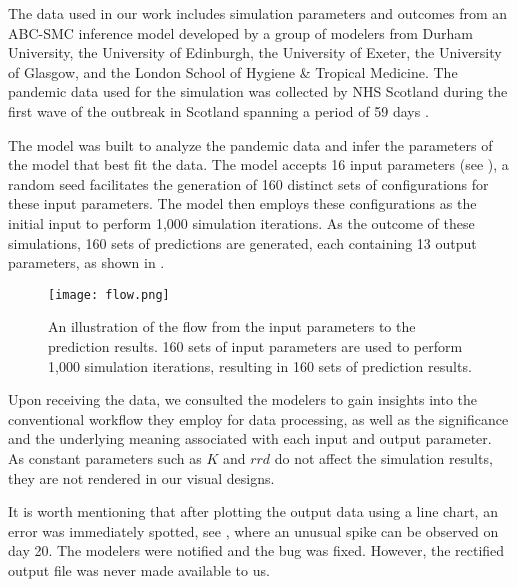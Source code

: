 The data used in our work includes simulation parameters and outcomes from an \ac{ABC-SMC} inference model \cite{toni2008Approximate} developed by a group of modelers from Durham University, the University of Edinburgh, the University of Exeter, the University of Glasgow, and the London School of Hygiene \& Tropical Medicine.
The pandemic data used for the simulation was collected by NHS Scotland during the first wave of the outbreak in Scotland spanning a period of 59 days \cite{scrc2020Covid19}.

\begin{samepage}
The model was built to analyze the pandemic data and infer the parameters of the model that best fit the data.
The model accepts 16 input parameters (see ), a random seed facilitates the generation of 160 distinct sets of configurations for these input parameters.
The model then employs these configurations as the initial input to perform 1,000 simulation iterations. As the outcome of these simulations, 160 sets of predictions are generated, each containing 13 output parameters, as shown in .

\begin{figure}[tb!]
    \centering
    \texttt{[image: flow.png]}
    \caption{An illustration of the flow from the input parameters to the prediction results. 160 sets of input parameters are used to perform 1,000 simulation iterations, resulting in 160 sets of prediction results.
    }
    \label{fig:flow}
\end{figure}

\end{samepage}


Upon receiving the data, we consulted the modelers to gain insights into the conventional workflow they employ for data processing, as well as the significance and the underlying meaning associated with each input and output parameter. As constant parameters such as $K$ and $rrd$ do not affect the simulation results, they are not rendered in our visual designs.

It is worth mentioning that after plotting the output data using a line chart, an error was immediately spotted, see , where an unusual spike can be observed on day 20.
The modelers were notified and the bug was fixed.
However, the rectified output file was never made available to us.
